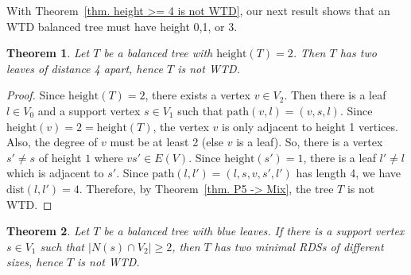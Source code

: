 \documentclass[12pt, reqno]{amsart}
\theoremstyle{definition}
\theoremstyle{plain}
\newtheorem{theorem}{Theorem}[section]
\theoremstyle{definition}
\newcommand{\hei}{\mbox{height}}
\newcommand{\dist}{\text{dist}}
\newcommand{\pth}{\mbox{path}}
\newcommand{\hh}{\mbox{height}}
\begin{document}
With Theorem~\ref{thm. height >= 4 is not WTD}, our next result shows that an WTD balanced tree must have height 0,1, or 3.

\begin{theorem}
\label{thm. height(T)=2 -> not WTD}
Let $T$ be a balanced tree with $\hei(T) = 2$.
Then $T$ has two leaves of distance 4 apart, hence $T$ is not WTD.
\end{theorem}

\begin{proof}
Since $\hei(T) = 2$, there exists a vertex $v \in V_2$. 
Then there is a leaf $l \in V_0$ and a support vertex $s \in V_1$ such that $\pth(v,l) = (v,s,l)$.
Since $\hei(v) = 2 = \hh(T)$, the vertex $v$ is only adjacent to height 1 vertices.
Also, the degree of $v$ must be at least 2 (else $v$ is a leaf).
So, there is a vertex $s' \neq s$ of height $1$ where $vs' \in E(V)$.
Since $\hh(s') = 1$, there is a leaf $l' \neq l$ which is adjacent to $s'$.
Since $\pth(l,l') = (l,s,v,s',l')$ has length 4, we have $\dist(l,l') = 4$. 
Therefore, by Theorem~\ref{thm. P5 -> Mix}, the tree $T$ is not WTD.
\end{proof}


\begin{theorem}
\label{thm. |N(s) cap V_2| > 1 -> not WTD}
Let $T$ be a balanced tree with blue leaves.
If there is a support vertex $s \in V_1$ such that $|N(s) \cap V_2| \geq 2$, then $T$ has two minimal RDSs of different sizes, hence $T$ is not WTD.
\end{theorem}
\end{document}
